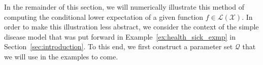 \documentclass[10pt,a4paper]{paper}
\theoremstyle{definition}
\newcommand{\states}{\mathcal{X}}
\newcommand{\gambles}{\mathcal{L}}
\newcommand{\gamblesX}{\gambles(\states)}
\newcommand{\rateset}{\mathcal{Q}}
\begin{document}
In the remainder of this section, we will numerically illustrate this method of computing the conditional lower expectation of a given function $f\in\gamblesX$. In order to make this illustration less abstract, we consider the context of the simple disease model that was put forward in Example~\ref{ex:health_sick_exmp} in Section~\ref{sec:introduction}. To this end, we first construct a parameter set $\rateset$ that we will use in the examples to come.



\end{document}
